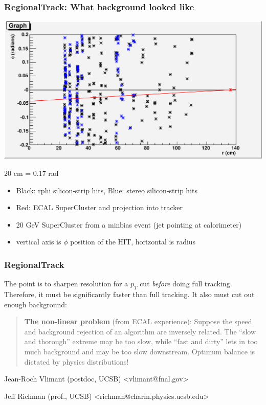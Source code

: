 \documentclass[12pt,compress]{beamer}
\begin{document}
\begin{frame}
\frametitle{RegionalTrack: What background looked like}

\begin{center}
\includegraphics[width=0.7\linewidth]{ecal_background} \hspace{1 cm}\begin{sideways}20 cm = 0.17 rad\end{sideways}
\end{center}
\small
\begin{minipage}{\linewidth}
\begin{itemize}\setlength{\itemsep}{-0.1 cm}
\item Black: rphi silicon-strip hits, Blue: stereo silicon-strip hits
\item Red: ECAL SuperCluster and projection into tracker
\item 20 GeV SuperCluster from a minbias event (jet pointing at calorimeter)
\item vertical axis is $\phi$ position of the HIT, horizontal is radius
\end{itemize}
\end{minipage}
\end{frame}

\begin{frame}
\frametitle{RegionalTrack}

The point is to sharpen resolution for a $p_T$ cut {\it before} doing
full tracking.  Therefore, it must be significantly faster than full
tracking.  It also must cut out enough background:

\begin{quote}
{\bf The non-linear problem} (from ECAL experience): Suppose the
speed and background rejection of an algorithm are inversely related.
The ``slow and thorough'' extreme may be too slow, while ``fast and
dirty'' lets in too much background and may be too slow downstream.
Optimum balance is dictated by physics distributions!
\end{quote}

\vfill \small Jean-Roch Vlimant (postdoc, UCSB) \textless vlimant@fnal.gov\textgreater

Jeff Richman (prof., UCSB) \textless richman@charm.physics.ucsb.edu\textgreater
\end{frame}
\end{document}
